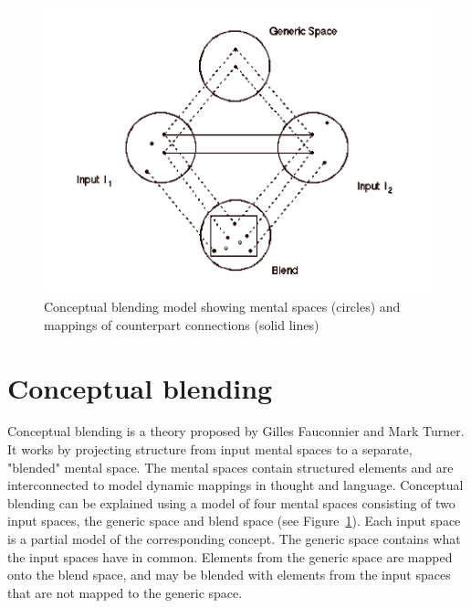 



\begin{figure}[h]
	\centering
	\includegraphics[width=0.7\linewidth]{"Figures/concept blending firkant"}
	\caption[Conceptual blending model]{Conceptual blending model showing mental spaces (circles) and mappings of counterpart connections (solid lines) \parencite{fauconnier1998conceptualfigure}}
	\label{fig:concept-blending-firkant}
\end{figure}

\section{Conceptual blending}
Conceptual blending is a theory proposed by Gilles Fauconnier and Mark Turner. It works by projecting structure from input mental spaces to a separate, "blended" mental space. \parencite{fauconnier1998conceptual}
The mental spaces contain structured elements and are interconnected to model dynamic mappings in thought and language.
Conceptual blending can be explained using a model of four mental spaces consisting of two input spaces, the generic space and blend space (see Figure~\ref{fig:concept-blending-firkant}).
Each input space is a partial model of the corresponding concept.
The generic space contains what the input spaces have in common.
Elements from the generic space are mapped onto the blend space, and may be blended with elements from the input spaces that are not mapped to the generic space.

